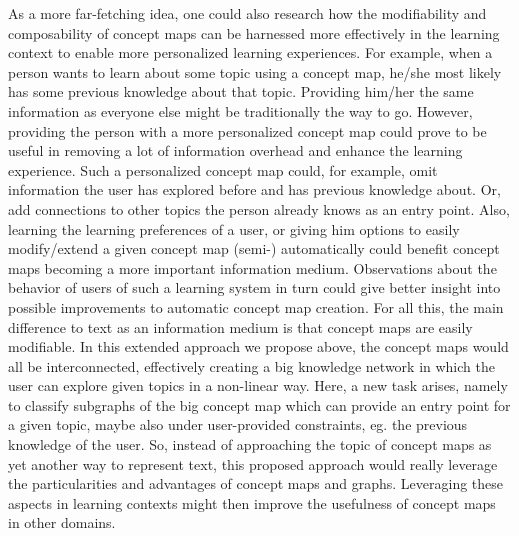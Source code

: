 As a more far-fetching idea, one could also research how the modifiability and composability of concept maps can be harnessed more effectively in the learning context to enable more personalized learning experiences.
For example, when a person wants to learn about some topic using a concept map, he/she most likely has some previous knowledge about that topic.
Providing him/her the same information as everyone else might be traditionally the way to go. 
However, providing the person with a more personalized concept map could prove to be useful in removing a lot of information overhead and enhance the learning experience.
Such a personalized concept map could, for example, omit information the user has explored before and has previous knowledge about.
Or, add connections to other topics the person already knows as an entry point.
Also, learning the learning preferences of a user, or giving him options to easily modify/extend a given concept map (semi-) automatically could benefit concept maps becoming a more important information medium.
Observations about the behavior of users of such a learning system in turn could give better insight into possible improvements to automatic concept map creation.
For all this, the main difference to text as an information medium is that concept maps are easily modifiable.
In this extended approach we propose above, the concept maps would all be interconnected, effectively creating a big knowledge network in which the user can explore given topics in a non-linear way.
Here, a new task arises, namely to classify subgraphs of the big concept map which can provide an entry point for a given topic, maybe also under user-provided constraints, eg. the previous knowledge of the user.
So, instead of approaching the topic of concept maps as yet another way to represent text, this proposed approach would really leverage the particularities and advantages of concept maps and graphs.
Leveraging these aspects in learning contexts might then improve the usefulness of concept maps in other domains.

